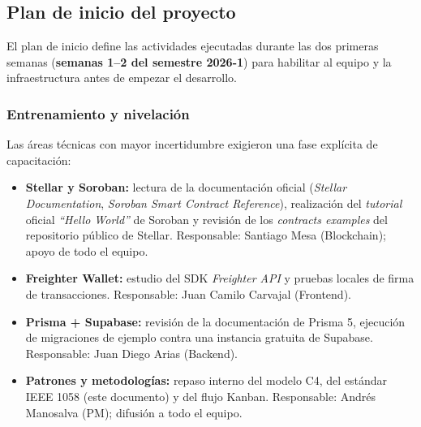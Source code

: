 \documentclass[12pt,oneside]{report}
\begin{document}
    \subsection{Plan de inicio del proyecto}
    \label{subsec:plan-inicio}

      El plan de inicio define las actividades ejecutadas durante las dos primeras semanas (\textbf{semanas 1--2 del semestre 2026-1}) para habilitar al equipo y la infraestructura antes de empezar el desarrollo.

      \subsubsection{Entrenamiento y nivelación}
      Las áreas técnicas con mayor incertidumbre exigieron una fase explícita de capacitación:
      \begin{itemize}
        \item \textbf{Stellar y Soroban:} lectura de la documentación oficial (\textit{Stellar Documentation}, \textit{Soroban Smart Contract Reference}), realización del \textit{tutorial} oficial \textit{``Hello World''} de Soroban y revisión de los \textit{contracts examples} del repositorio público de Stellar. Responsable: Santiago Mesa (Blockchain); apoyo de todo el equipo.
        \item \textbf{Freighter Wallet:} estudio del SDK \textit{Freighter API} y pruebas locales de firma de transacciones. Responsable: Juan Camilo Carvajal (Frontend).
        \item \textbf{Prisma + Supabase:} revisión de la documentación de Prisma 5, ejecución de migraciones de ejemplo contra una instancia gratuita de Supabase. Responsable: Juan Diego Arias (Backend).
        \item \textbf{Patrones y metodologías:} repaso interno del modelo C4, del estándar IEEE 1058 (este documento) y del flujo Kanban. Responsable: Andrés Manosalva (PM); difusión a todo el equipo.
      \end{itemize}
\end{document}
